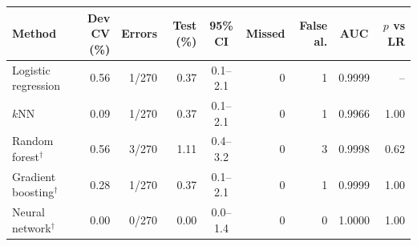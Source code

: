 \begin{tabular}{lrrrcrrcr}
\toprule
Method & Dev CV (\%) & Errors & Test (\%) & 95\% CI & Missed & False al. & AUC & $p$ vs LR \\
\midrule
Logistic regression & 0.56 & 1/270 & 0.37 & 0.1--2.1 & 0 & 1 & 0.9999 & -- \\
$k$NN & 0.09 & 1/270 & 0.37 & 0.1--2.1 & 0 & 1 & 0.9966 & 1.00 \\
Random forest$^\dagger$ & 0.56 & 3/270 & 1.11 & 0.4--3.2 & 0 & 3 & 0.9998 & 0.62 \\
Gradient boosting$^\dagger$ & 0.28 & 1/270 & 0.37 & 0.1--2.1 & 0 & 1 & 0.9999 & 1.00 \\
Neural network$^\dagger$ & 0.00 & 0/270 & 0.00 & 0.0--1.4 & 0 & 0 & 1.0000 & 1.00 \\
\bottomrule
\end{tabular}
